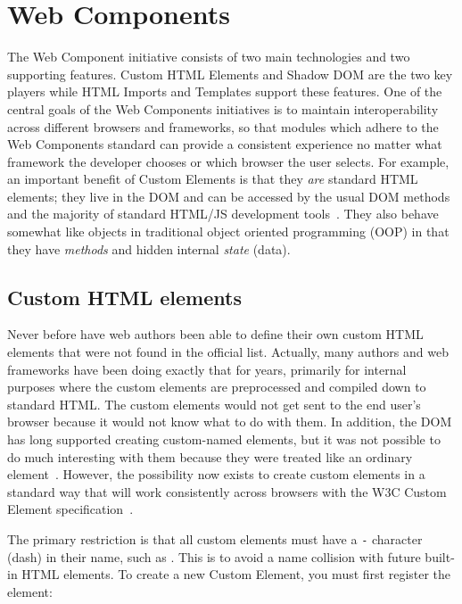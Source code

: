 \section{Web Components}

The Web Component initiative consists of two main technologies and two supporting features. 
Custom HTML Elements and Shadow DOM are the two key players while HTML Imports and Templates support these features. 
One of the central goals of the Web Components initiatives is to maintain interoperability across different browsers and frameworks, 
so that modules which adhere to the Web Components standard can provide a consistent experience no matter what framework the developer chooses or which browser the user selects.
For example, an important benefit of Custom Elements is that they \textit{are} standard HTML elements; they live in the DOM and can be accessed by the usual DOM methods and the majority of standard HTML/JS development tools~\cite{penades2015}.
They also behave somewhat like objects in traditional object oriented programming (OOP) in that 
they have \textit{methods} and hidden internal \textit{state} (data).

\subsection{Custom HTML elements}
Never before have web authors been able to define their own custom HTML elements that were not found in the official list.
Actually, many authors and web frameworks have been doing exactly that for years, primarily for internal purposes where the custom elements are pre\-processed and compiled down to standard HTML.
The custom elements would not get sent to the end user's browser because it would not know what to do with them.
In addition, the DOM has long supported creating custom-named elements, but it was not possible to do much interesting with them because they were treated like an ordinary 
 element~\cite{w3ccontributors2015-b}.
However, the possibility now exists to create custom elements in a standard way that will work consistently across browsers with the W3C Custom Element 
specification~\cite{w3ccontributors2015-b}. 

The primary restriction is that all custom elements must have a \texttt{-} character (dash) in their name, such as . 
This is to avoid a name collision with future built-in HTML elements. 
To create a new Custom Element, you must first register the element:

